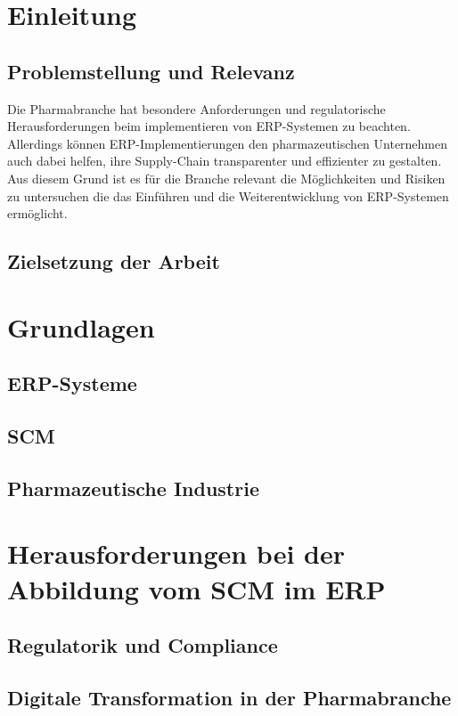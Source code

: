 \documentclass{article}
\begin{document}
\maketitle
\newpage
\tableofcontents
\newpage
\section{Einleitung}
\subsection{Problemstellung und Relevanz}
Die Pharmabranche hat besondere Anforderungen und regulatorische Herausforderungen beim implementieren von ERP-Systemen zu beachten.
Allerdings können ERP-Implementierungen den pharmazeutischen Unternehmen auch dabei helfen, ihre Supply-Chain transparenter und effizienter zu gestalten.
Aus diesem Grund ist es für die Branche relevant die Möglichkeiten und Risiken zu untersuchen die das Einführen und die Weiterentwicklung von ERP-Systemen ermöglicht.
\subsection{Zielsetzung der Arbeit}
\section{Grundlagen}
\subsection{ERP-Systeme}
\subsection{SCM}
\subsection{Pharmazeutische Industrie}

\section{Herausforderungen bei der Abbildung vom SCM im ERP}
\subsection{Regulatorik und Compliance}
\subsection{Digitale Transformation in der Pharmabranche}
\end{document}

